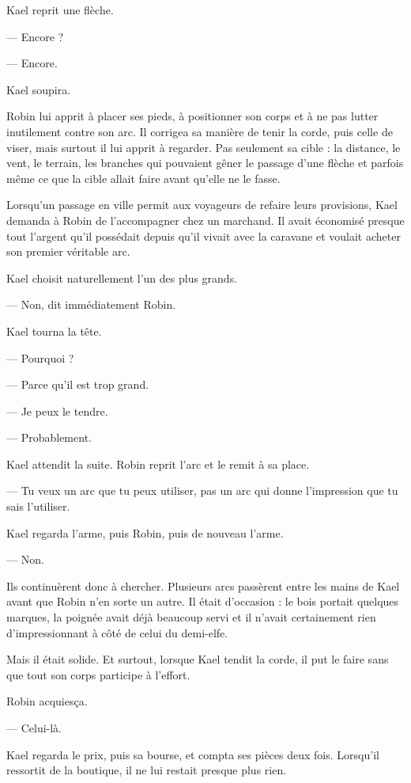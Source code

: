 Kael reprit une flèche.

— Encore ?

— Encore.

Kael soupira.

Robin lui apprit à placer ses pieds, à positionner son corps et à ne pas lutter
inutilement contre son arc. Il corrigea sa manière de tenir la corde, puis
celle de viser, mais surtout il lui apprit à regarder. Pas seulement sa cible :
la distance, le vent, le terrain, les branches qui pouvaient gêner le passage
d'une flèche et parfois même ce que la cible allait faire avant qu'elle ne le
fasse.

Lorsqu'un passage en ville permit aux voyageurs de refaire leurs provisions,
Kael demanda à Robin de l'accompagner chez un marchand. Il avait économisé
presque tout l'argent qu'il possédait depuis qu'il vivait avec la caravane et
voulait acheter son premier véritable arc.

\scenebreak

Kael choisit naturellement l'un des plus grands.

— Non, dit immédiatement Robin.

Kael tourna la tête.

— Pourquoi ?

— Parce qu'il est trop grand.

— Je peux le tendre.

— Probablement.

Kael attendit la suite. Robin reprit l'arc et le remit à sa place.

— Tu veux un arc que tu peux utiliser, pas un arc qui donne l'impression que
tu sais l'utiliser.

Kael regarda l'arme, puis Robin, puis de nouveau l'arme.

— Non.

Ils continuèrent donc à chercher. Plusieurs arcs passèrent entre les mains de
Kael avant que Robin n'en sorte un autre. Il était d'occasion : le bois portait
quelques marques, la poignée avait déjà beaucoup servi et il n'avait
certainement rien d'impressionnant à côté de celui du demi-elfe.

Mais il était solide. Et surtout, lorsque Kael tendit la corde, il put le faire
sans que tout son corps participe à l'effort.

Robin acquiesça.

— Celui-là.

Kael regarda le prix, puis sa bourse, et compta ses pièces deux fois.
Lorsqu'il ressortit de la boutique, il ne lui restait presque plus rien.

